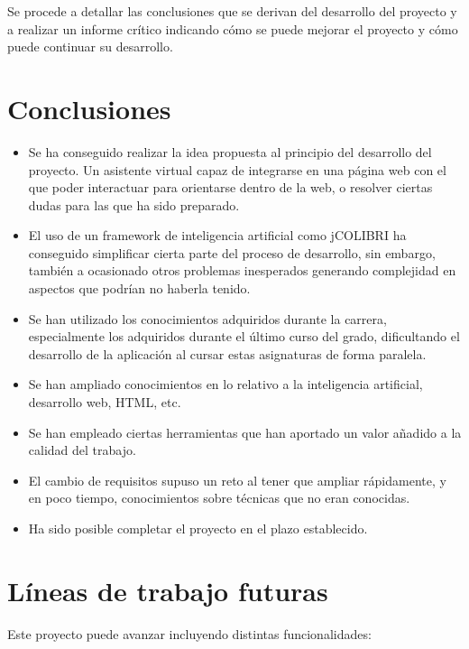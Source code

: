 
Se procede a detallar las conclusiones que se derivan del desarrollo del proyecto y a realizar un informe crítico indicando cómo se puede mejorar el proyecto y cómo puede continuar su desarrollo.

\section{Conclusiones}

\begin{itemize}
\tightlist
\item
Se ha conseguido realizar la idea propuesta al principio del desarrollo del proyecto. Un asistente virtual capaz de integrarse en una página web con el que poder interactuar para orientarse dentro de la web, o resolver ciertas dudas para las que ha sido preparado.
\item
El uso de un framework de inteligencia artificial como jCOLIBRI ha conseguido simplificar cierta parte del proceso de desarrollo, sin embargo, también a ocasionado otros problemas inesperados generando complejidad en aspectos que podrían no haberla tenido.
\item
Se han utilizado los conocimientos adquiridos durante la carrera, especialmente los adquiridos durante el último curso del grado, dificultando el desarrollo de la aplicación al cursar estas asignaturas de forma paralela.
\item
Se han ampliado conocimientos en lo relativo a la inteligencia artificial, desarrollo web, HTML, etc.
\item
Se han empleado ciertas herramientas que han aportado un valor añadido a la calidad del trabajo.
\item
El cambio de requisitos supuso un reto al tener que ampliar rápidamente, y en poco tiempo, conocimientos sobre técnicas que no eran conocidas.
\item
Ha sido posible completar el proyecto en el plazo establecido.
\end{itemize}

\section{Líneas de trabajo futuras}

Este proyecto puede avanzar incluyendo distintas funcionalidades:

